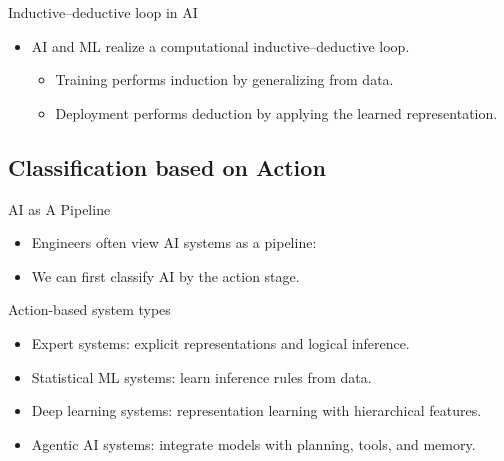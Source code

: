 \documentclass[12pt]{beamer}
\begin{document}
\begin{frame}{Inductive--deductive loop in AI}
  \begin{itemize}
    \item AI and ML realize a computational inductive--deductive loop.
      \begin{itemize}
        \item Training performs induction by generalizing from data.
        \item Deployment performs deduction by applying the learned representation.
      \end{itemize}
  \end{itemize}
\end{frame}

\subsection{Classification based on Action}

\begin{frame}{AI as A Pipeline}
  \begin{itemize}
    \item Engineers often view AI systems as a pipeline:
 
  \end{itemize}
  \vspace{0.5em}
  \centering
  \begin{itemize}
     \item We can first classify AI by the action stage.
  \end{itemize}
\end{frame}

\begin{frame}{Action-based system types}
  \begin{itemize}
    \item Expert systems: explicit representations and logical inference.
    \item Statistical ML systems: learn inference rules from data.
    \item Deep learning systems: representation learning with hierarchical features.
    \item Agentic AI systems: integrate models with planning, tools, and memory.
  \end{itemize}
\end{frame}
\end{document}
